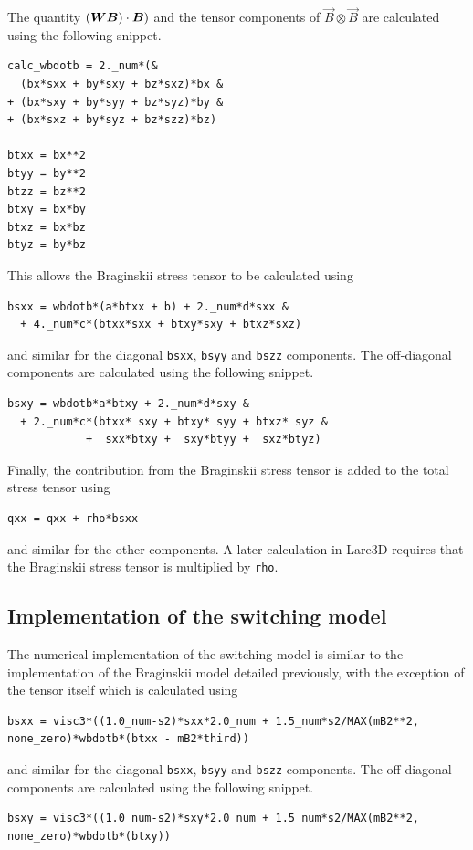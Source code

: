 The quantity $({\bm W} {\bm B}) \cdot {\bm B})$ and the tensor components of $\vec{B} \otimes \vec{B}$ are calculated using the following snippet.
\begin{verbatim}
calc_wbdotb = 2._num*(&
  (bx*sxx + by*sxy + bz*sxz)*bx &
+ (bx*sxy + by*syy + bz*syz)*by &
+ (bx*sxz + by*syz + bz*szz)*bz)

btxx = bx**2
btyy = by**2
btzz = bz**2
btxy = bx*by
btxz = bx*bz
btyz = by*bz
\end{verbatim}

This allows the Braginskii stress tensor to be calculated using
\begin{verbatim}
bsxx = wbdotb*(a*btxx + b) + 2._num*d*sxx &
  + 4._num*c*(btxx*sxx + btxy*sxy + btxz*sxz)
\end{verbatim}
and similar for the diagonal \verb|bsxx|, \verb|bsyy| and \verb|bszz| components. The off-diagonal components are calculated using the following snippet.
\begin{verbatim}
bsxy = wbdotb*a*btxy + 2._num*d*sxy &
  + 2._num*c*(btxx* sxy + btxy* syy + btxz* syz &
            +  sxx*btxy +  sxy*btyy +  sxz*btyz)
\end{verbatim}

Finally, the contribution from the Braginskii stress tensor is added to the total stress tensor using 
\begin{verbatim}
qxx = qxx + rho*bsxx
\end{verbatim}
and similar for the other components. A later calculation in Lare3D requires that the Braginskii stress tensor is multiplied by \verb|rho|.

\subsection{Implementation of the switching model}

The numerical implementation of the switching model is similar to the implementation of the Braginskii model detailed previously, with the exception of the tensor itself which is calculated using
\begin{verbatim}
bsxx = visc3*((1.0_num-s2)*sxx*2.0_num + 1.5_num*s2/MAX(mB2**2, none_zero)*wbdotb*(btxx - mB2*third))
\end{verbatim}
and similar for the diagonal \verb|bsxx|, \verb|bsyy| and \verb|bszz| components. The off-diagonal components are calculated using the following snippet.
\begin{verbatim}
bsxy = visc3*((1.0_num-s2)*sxy*2.0_num + 1.5_num*s2/MAX(mB2**2, none_zero)*wbdotb*(btxy))
\end{verbatim}

